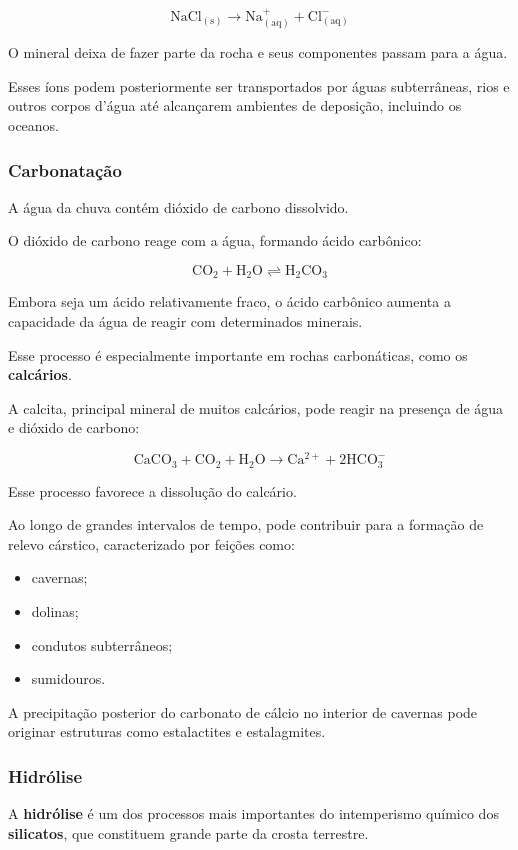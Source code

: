 \[
\mathrm{NaCl_{(s)}
\rightarrow
Na^+_{(aq)} + Cl^-_{(aq)}}
\]

O mineral deixa de fazer parte da rocha e seus componentes passam para a água.

Esses íons podem posteriormente ser transportados por águas subterrâneas, rios e outros corpos d'água até alcançarem ambientes de deposição, incluindo os oceanos.

\subsubsection{Carbonatação}

A água da chuva contém dióxido de carbono dissolvido.

O dióxido de carbono reage com a água, formando ácido carbônico:

\[
\mathrm{CO_2 + H_2O
\rightleftharpoons
H_2CO_3}
\]

Embora seja um ácido relativamente fraco, o ácido carbônico aumenta a capacidade da água de reagir com determinados minerais.

Esse processo é especialmente importante em rochas carbonáticas, como os \textbf{calcários}.

A calcita, principal mineral de muitos calcários, pode reagir na presença de água e dióxido de carbono:

\[
\mathrm{CaCO_3 + CO_2 + H_2O
\rightarrow
Ca^{2+} + 2HCO_3^-}
\]

Esse processo favorece a dissolução do calcário.

Ao longo de grandes intervalos de tempo, pode contribuir para a formação de relevo cárstico, caracterizado por feições como:

\begin{itemize}
    \item cavernas;
    \item dolinas;
    \item condutos subterrâneos;
    \item sumidouros.
\end{itemize}

A precipitação posterior do carbonato de cálcio no interior de cavernas pode originar estruturas como estalactites e estalagmites.

\subsubsection{Hidrólise}

A \textbf{hidrólise} é um dos processos mais importantes do intemperismo químico dos \textbf{silicatos}, que constituem grande parte da crosta terrestre.

